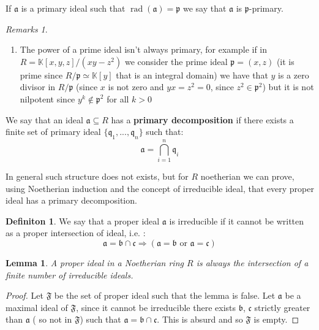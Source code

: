 \documentclass[notitlepage, a4]{book}
\theoremstyle{plain}
\newtheorem{lem}[teo]{Lemma}
\theoremstyle{remark}
\newtheorem{rems}[rem]{Remarks}
\theoremstyle{definition}
\newtheorem{deff}[teo]{Definiton}
\newcommand{\K}{\mathbb{K}}
\newcommand{\p}{\mathfrak{p}}
\newcommand{\q}{\mathfrak{q}}
\newcommand{\A}{\mathfrak{a}}
\newcommand{\B}{\mathfrak{b}}
\newcommand{\Cc}{\mathfrak{c}}
\DeclareMathOperator{\rad}{rad}
\begin{document}
If $ \A $ is a primary ideal such that $ \rad(\A) = \p $ we say that $ \A $ is {$ \p $-primary}.

\begin{rems} \label{rem:power_primary} \quad 
	\begin{enumerate}
	\item The power of a prime ideal isn't always primary, for example if in $ R = \K[x,y,z] / (xy - z^2) $ we consider the prime ideal $ \p = (x,z) $ (it is prime since $ R / \p \simeq \K[y]$ that is an integral domain) we have that $ y $ is a zero divisor in $R/\p $ (since $ x $ is not zero and $ yx = z^2 = 0 $, since $z^2 \in \p^2 $) but it is not nilpotent since $ y^k \not \in \p^2 $ for all $ k>0 $
	\end{enumerate}
\end{rems}

We say that an ideal $ \A \subseteq R $ has a \textbf{primary decomposition}  if there exists a finite set of primary ideal $ \{ \q_1 , ... , \q_n\} $ such that:
\begin{equation*}
	\A = \bigcap_{i=1}^n \q_i
\end{equation*}

In general such structure does not exists, but for $ R $ noetherian we can prove, using Noetherian induction and the concept of irreducible ideal, that every proper ideal has a primary decomposition.

\begin{deff}
	We say that a proper ideal $ \A $ is irreducible if it cannot be written as a proper intersection of ideal, i.e. :
	\begin{equation*}
		\A = \B \cap \Cc \Longrightarrow (\A = \B \text{ or } \A = \Cc)
	\end{equation*}
\end{deff}

\begin{lem}
	A proper ideal in a Noetherian ring $ R $ is always the intersection of a finite number of irreducible ideals.
\end{lem}

\begin{proof}
	Let $ \mathfrak{F} $ be the set of proper ideal such that the lemma is false. Let $ \A $ be a maximal ideal of $ \mathfrak{F} $, since it cannot be irreducible there exists $ \B $, $ \Cc $ strictly greater than $ \A $ ( so not in $ \mathfrak{F} $) such that $ \A = \B \cap \Cc $. This is absurd and so $ \mathfrak{F} $ is empty.
\end{proof}
\end{document}
